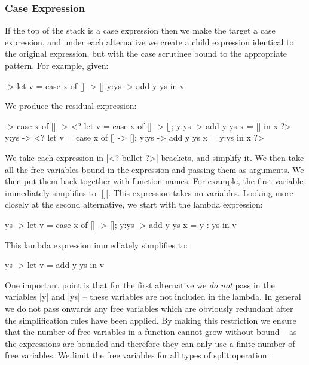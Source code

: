 \documentclass[draft]{sigplanconf}
\begin{document}
\subsubsection{Case Expression}

If the top of the stack is a case expression then we make the target a case expression, and under each alternative we create a child expression identical to the original expression, but with the case scrutinee bound to the appropriate pattern. For example, given:

\begin{code}
\x ->  let   v = case  x of
                       [] -> []
                       y:ys -> add y ys
       in    v
\end{code}

We produce the residual expression:

\begin{code}
\x ->  case x of
       []    -> <?  let  v =  case x of [] -> []; y:ys -> add y ys
                         x =  []
                    in   x ?>
       y:ys  -> <?  let  v =  case x of [] -> []; y:ys -> add y ys
                         x =  y:ys
                    in   x ?>
\end{code}

We take each expression in |<? bullet ?>| brackets, and simplify it. We then take all the free variables bound in the expression and passing them as arguments. We then put them back together with function names. For example, the first variable immediately simplifies to |[]|. This expression takes no variables. Looking more closely at the second alternative, we start with the lambda expression:

\begin{code}
\y ys ->  let  v = case x of [] -> []; y:ys -> add y ys
               x = y : ys
          in v
\end{code}

This lambda expression immediately simplifies to:

\begin{code}
\y ys ->  let  v = add y ys
          in v
\end{code}

One important point is that for the first alternative we \textit{do not} pass in the variables |y| and |ys| -- these variables are not included in the lambda. In general we do not pass onwards any free variables which are obviously redundant after the simplification rules have been applied. By making this restriction we ensure that the number of free variables in a function cannot grow without bound -- as the expressions are bounded and therefore they can only use a finite number of free variables. We limit the free variables for all types of split operation.
\end{document}
